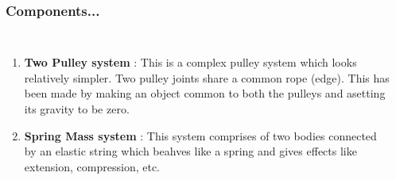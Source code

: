\documentclass{beamer}
\begin{document}
\begin{frame}
\frametitle{Components...}
\begin{columns}
\begin{enumerate}
\item {} \textbf{Two Pulley system} : This is a complex pulley system which looks relatively simpler. Two pulley joints share a common rope (edge). This has been made by making an object common to both the pulleys and asetting its gravity to be zero.
\item {} \textbf{Spring Mass system} : This system comprises of two bodies connected by an elastic string which beahves like a spring and gives effects like extension, compression, etc.  
\end{enumerate}
\\
\end{columns}
\end{frame}
\end{document}
